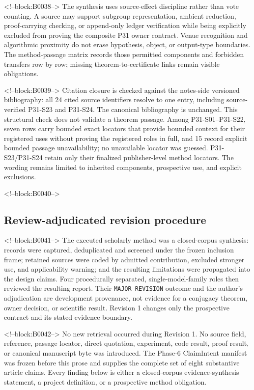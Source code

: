 \documentclass[11pt]{article}
\begin{document}
<!--block:B0038-->
The synthesis uses source-effect discipline rather than vote counting.  A source
may support subgroup representation, ambient reduction, proof-carrying checking,
or append-only ledger verification while being explicitly excluded from proving
the composite P31 owner contract.  Venue recognition and algorithmic proximity do
not erase hypothesis, object, or output-type boundaries.  The method-passage
matrix records those permitted components and forbidden transfers row by row;
missing theorem-to-certificate links remain visible obligations.

<!--block:B0039-->
Citation closure is checked against the notes-side versioned bibliography: all
24 cited source identifiers resolve to one entry, including source-verified
P31-S23 and P31-S24. The canonical bibliography is unchanged. This structural
check does not validate a theorem passage. Among P31-S01--P31-S22, seven rows
carry bounded exact locators that provide bounded context for their registered
uses without proving the registered roles in full, and 15 record explicit bounded
passage unavailability; no unavailable locator was guessed.
P31-S23/P31-S24 retain only their finalized publisher-level method locators. The
wording remains limited to inherited components, prospective use, and explicit
exclusions.

<!--block:B0040-->
\hypertarget{32-review-adjudicated-revision-procedure}{%
\subsection{Review-adjudicated revision
procedure}\label{32-review-adjudicated-revision-procedure}}

<!--block:B0041-->
The executed scholarly method was a closed-corpus synthesis: records were
captured, deduplicated and screened under the frozen inclusion frame; retained
sources were coded by admitted contribution, excluded stronger use, and
applicability warning; and the resulting limitations were propagated into the
design claims. Four procedurally separated, single-model-family roles then
reviewed the resulting report. Their \texttt{MAJOR\_REVISION} outcome and the
author's adjudication are development provenance, not evidence for a conjugacy
theorem, owner decision, or scientific result. Revision 1 changes only the
prospective contract and its stated evidence boundary.

<!--block:B0042-->
No new retrieval occurred during Revision 1. No source field, reference,
passage locator, direct quotation, experiment, code result, proof
result, or canonical manuscript byte was introduced. The Phase-6
ClaimIntent manifest was frozen before this prose and supplies the
complete set of eight substantive article claims. Every finding below is
either a closed-corpus evidence-synthesis statement, a project
definition, or a prospective method obligation.
\end{document}
